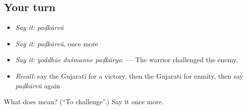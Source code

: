 \subsection*{Your turn}
\begin{itemize}
\raggedright
  \item \emph{Say it:} \emph{paḍkārvũ}
  \item \emph{Say it:} \emph{paḍkārvũ}, once more
  \item \emph{Say it:} \emph{yoddhāe duśmanne paḍkāryo.} — The warrior challenged the enemy.
  \item \emph{Recall:} say the Gujarati for a victory, then the Gujarati for enmity, then say \emph{paḍkārvũ} again
\end{itemize}

\begin{tcolorbox}[breakable,colback=teal!4,colframe=teal!35!black,title={Before you move on}]
What does  mean? (\textquotedblleft{}To challenge\textquotedblright{}.) Say it once more.
\end{tcolorbox}
